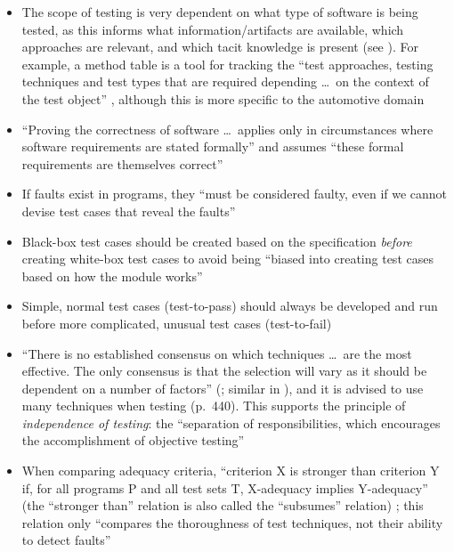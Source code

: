 \begin{itemize}
      \item The scope of testing is very dependent on what type of software
            is being tested, as this informs what information/artifacts are
            available, which approaches are relevant, and which tacit knowledge
            is present (see ). For example, a method table
            is a tool for tracking the ``test approaches, testing techniques
            and test types that are required depending \dots\ on the context of
            the test object'' \citepISTQB{} , although
            this is more specific to the automotive domain
      \item ``Proving the correctness of software \dots\ applies only in
            circumstances where software requirements are stated formally'' and
            assumes ``these formal requirements are themselves correct''
            \citep[p.~398]{vanVliet2000}
      \item If faults exist in programs, they ``must be considered faulty, even
            if we cannot devise test cases that reveal the faults''
            \citep[p.~401]{vanVliet2000}
      \item Black-box test cases should be created based on the specification
            \emph{before} creating white-box test cases to avoid being ``biased
            into creating test cases based on how the module works''
            \citep[p.~113]{Patton2006}
      \item Simple, normal test cases (test-to-pass) should always be developed
            and run before more complicated, unusual test cases (test-to-fail)
            \citep[p.~66]{Patton2006}
      \item ``There is no established consensus on which techniques \dots\ are
            the most effective. The only consensus is that the selection will
            vary as it should be dependent on a number of factors''
            (\citealp[p.~128]{IEEE2021}; similar in
            \citealp[p.~440]{vanVliet2000}), and it is advised to
            use many techniques when testing (p.~440).
            This supports the principle of \emph{independence of testing}: the
            ``separation of responsibilities, which encourages the
            accomplishment of objective testing'' \citepISTQB{}
      \item When comparing adequacy criteria, ``criterion X is stronger than
            criterion Y if, for all programs P and all test sets T, X-adequacy
            implies Y-adequacy'' (the ``stronger than'' relation is also called
            the ``subsumes'' relation) \citep[p.~432]{vanVliet2000};
            this relation only ``compares the thoroughness of test techniques,
            not their ability to detect faults'' \citep[p.~434]{vanVliet2000}
\end{itemize}

